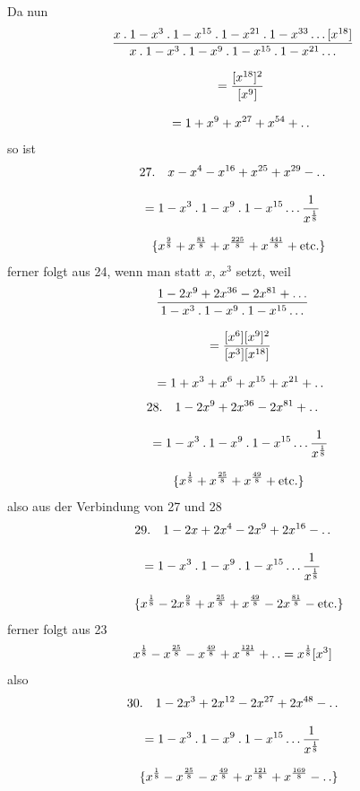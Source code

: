 Da nun
\[
\begin{gathered}\frac{x\mathbin{.}1-x^{3}\mathbin{.}1-x^{15}\mathbin{.}1-x^{21}\mathbin{.}1-x^{33}\mathinner{.\,.\,.}[x^{18}]}
     {x\mathbin{.}1-x^{3}\mathbin{.}1-x^{9}\mathbin{.}1-x^{15}\mathbin{.}1-x^{21}\mathinner{.\,.\,.}}
 \\[8pt]\quad{}=\frac{[x^{18}]^{2}}{[x^{9}]}
\\[8pt]\quad{} =1+x^{9}+x^{27}+x^{54}+\mathinner{.\,.}\end{gathered}
\]
so ist
\[
\begin{gathered}
27.\quad x-x^{4}-x^{16}+x^{25}+x^{29}-\mathinner{.\,.}\\[8pt]
 =1-x^{3}\mathbin{.}1-x^{9}\mathbin{.}1-x^{15}\mathinner{.\,.\,.}\frac{1}{x^{\frac18}}
 \\[8pt]\quad{}\{x^{\frac98}+x^{\frac{81}{8}}+x^{\frac{225}{8}}+x^{\frac{441}{8}}+\mathrm{etc.}\}
\end{gathered}
\]
ferner folgt aus 24, wenn man statt $x$, $x^{3}$ setzt, weil
\[
\begin{gathered}\frac{1-2x^{9}+2x^{36}-2x^{81}+\mathinner{.\,.\,.}}
     {1-x^{3}\mathbin{.}1-x^{9}\mathbin{.}1-x^{15}\mathinner{.\,.\,.}}
 \\[8pt]\quad{}=\frac{[x^{6}][x^{9}]^{2}}{[x^{3}][x^{18}]}
\\[8pt]\quad{} =1+x^{3}+x^{6}+x^{15}+x^{21}+\mathinner{.\,.}\end{gathered}
\]
\[
\begin{gathered}28.\quad 1-2x^{9}+2x^{36}-2x^{81}+\mathinner{.\,.}
\\[8pt]\quad{} =1-x^{3}\mathbin{.}1-x^{9}\mathbin{.}1-x^{15}\mathinner{.\,.\,.}\frac{1}{x^{\frac18}}
 \\[8pt]\quad{}\{x^{\frac18}+x^{\frac{25}{8}}+x^{\frac{49}{8}}+\mathrm{etc.}\}\end{gathered}
\]
also aus der Verbindung von 27 und 28
\[
\begin{gathered}
29.\quad 1-2x+2x^{4}-2x^{9}+2x^{16}-\mathinner{.\,.}\\[8pt]
 =1-x^{3}\mathbin{.}1-x^{9}\mathbin{.}1-x^{15}\mathinner{.\,.\,.}\frac{1}{x^{\frac18}}
 \\[8pt]\quad{}\{x^{\frac18}-2x^{\frac98}+x^{\frac{25}{8}}+x^{\frac{49}{8}}-2x^{\frac{81}{8}}-\mathrm{etc.}\}
\end{gathered}
\]
ferner folgt aus 23
\[
x^{\frac18}-x^{\frac{25}{8}}-x^{\frac{49}{8}}+x^{\frac{121}{8}}+\mathinner{.\,.}
 =x^{\frac18}[x^{3}]
\]
also
\[
\begin{gathered}
30.\quad 1-2x^{3}+2x^{12}-2x^{27}+2x^{48}-\mathinner{.\,.}\\[8pt]
 =1-x^{3}\mathbin{.}1-x^{9}\mathbin{.}1-x^{15}\mathinner{.\,.\,.}\frac{1}{x^{\frac18}}
 \\[8pt]\quad{}\{x^{\frac18}-x^{\frac{25}{8}}-x^{\frac{49}{8}}+x^{\frac{121}{8}}+x^{\frac{169}{8}}-\mathinner{.\,.}\}
\end{gathered}
\]
